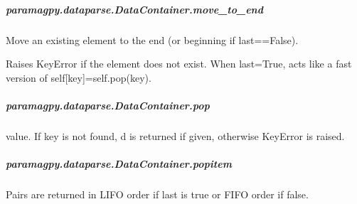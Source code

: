 \documentclass[a4paper,10pt,english]{sphinxmanual}
\begin{document}
\begin{fulllineitems}
\begin{fulllineitems}
\subparagraph{paramagpy.dataparse.DataContainer.move\_to\_end}
\label{\detokenize{reference/generated/paramagpy.dataparse.DataContainer.move_to_end:paramagpy-dataparse-datacontainer-move-to-end}}\label{\detokenize{reference/generated/paramagpy.dataparse.DataContainer.move_to_end::doc}}

\begin{fulllineitems}
\label{\detokenize{reference/generated/paramagpy.dataparse.DataContainer.move_to_end:paramagpy.dataparse.DataContainer.move_to_end}}
Move an existing element to the end (or beginning if last==False).

Raises KeyError if the element does not exist.
When last=True, acts like a fast version of self{[}key{]}=self.pop(key).

\end{fulllineitems}



\subparagraph{paramagpy.dataparse.DataContainer.pop}
\label{\detokenize{reference/generated/paramagpy.dataparse.DataContainer.pop:paramagpy-dataparse-datacontainer-pop}}\label{\detokenize{reference/generated/paramagpy.dataparse.DataContainer.pop::doc}}

\begin{fulllineitems}
\label{\detokenize{reference/generated/paramagpy.dataparse.DataContainer.pop:paramagpy.dataparse.DataContainer.pop}}
value.  If key is not found, d is returned if given, otherwise KeyError
is raised.

\end{fulllineitems}



\subparagraph{paramagpy.dataparse.DataContainer.popitem}
\label{\detokenize{reference/generated/paramagpy.dataparse.DataContainer.popitem:paramagpy-dataparse-datacontainer-popitem}}\label{\detokenize{reference/generated/paramagpy.dataparse.DataContainer.popitem::doc}}

\begin{fulllineitems}
\label{\detokenize{reference/generated/paramagpy.dataparse.DataContainer.popitem:paramagpy.dataparse.DataContainer.popitem}}
Pairs are returned in LIFO order if last is true or FIFO order if false.


\end{fulllineitems}
\end{fulllineitems}
\end{fulllineitems}
\end{document}
